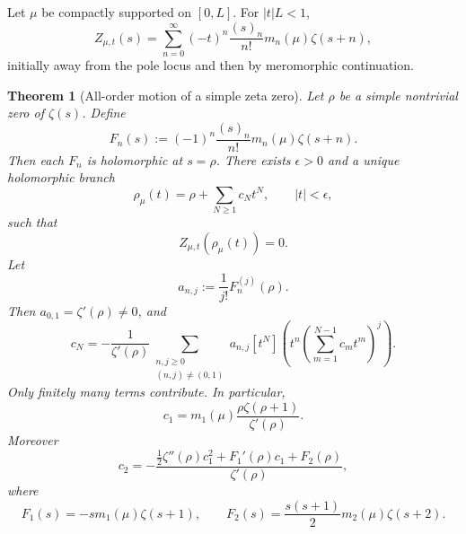 \documentclass[11pt]{article}
\newcommand{\1}{\mathbf 1}
\newtheorem{theorem}{Theorem}[section]
\numberwithin{equation}{section}
\begin{document}
Let $\mu$ be compactly supported on $[0,L]$.  For $|t|L<1$,
\begin{equation}\label{eq:hurwitz-average-expansion}
  Z_{\mu,t}(s)=\sum_{n=0}^\infty
  (-t)^n\frac{(s)_n}{n!}m_n(\mu)\zeta(s+n),
\end{equation}
initially away from the pole locus and then by meromorphic continuation.

\begin{theorem}[All-order motion of a simple zeta zero]\label{thm:zero-motion}
Let $\rho$ be a simple nontrivial zero of $\zeta(s)$.  Define
\begin{equation}
  F_n(s):=(-1)^n\frac{(s)_n}{n!}m_n(\mu)\zeta(s+n).
\end{equation}
Then each $F_n$ is holomorphic at $s=\rho$.  There exists $\epsilon>0$ and a unique holomorphic branch
\begin{equation}
  \rho_\mu(t)=\rho+\sum_{N\ge1}c_Nt^N,
  \qquad |t|<\epsilon,
\end{equation}
such that
\begin{equation}
  Z_{\mu,t}(\rho_\mu(t))=0.
\end{equation}
Let
\begin{equation}
  a_{n,j}:=\frac1{j!}F_n^{(j)}(\rho).
\end{equation}
Then $a_{0,1}=\zeta'(\rho)\ne0$, and
\begin{equation}\label{eq:zero-recursion}
  c_N=-\frac1{\zeta'(\rho)}
  \sum_{\substack{n,j\ge0\\(n,j)\ne(0,1)}}
  a_{n,j}
  [t^N]\left(t^n\left(\sum_{m=1}^{N-1}c_mt^m\right)^j\right).
\end{equation}
Only finitely many terms contribute.  In particular,
\begin{equation}\label{eq:c1-zero}
  c_1=m_1(\mu)\frac{\rho\zeta(\rho+1)}{\zeta'(\rho)}.
\end{equation}
Moreover
\begin{equation}\label{eq:c2-zero}
  c_2=-\frac{\frac12\zeta''(\rho)c_1^2+F_1'(\rho)c_1+F_2(\rho)}{\zeta'(\rho)},
\end{equation}
where
\begin{equation}
  F_1(s)=-s m_1(\mu)\zeta(s+1),
  \qquad
  F_2(s)=\frac{s(s+1)}2m_2(\mu)\zeta(s+2).
\end{equation}
\end{theorem}
\end{document}
